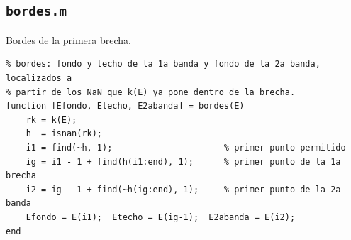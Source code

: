 \documentclass[hidelinks]{article}
\begin{document}
\subsection{\texttt{bordes.m}}
Bordes de la primera brecha.
\begin{lstlisting}
% bordes: fondo y techo de la 1a banda y fondo de la 2a banda, localizados a
% partir de los NaN que k(E) ya pone dentro de la brecha.
function [Efondo, Etecho, E2abanda] = bordes(E)
    rk = k(E);
    h  = isnan(rk);
    i1 = find(~h, 1);                      % primer punto permitido
    ig = i1 - 1 + find(h(i1:end), 1);      % primer punto de la 1a brecha
    i2 = ig - 1 + find(~h(ig:end), 1);     % primer punto de la 2a banda
    Efondo = E(i1);  Etecho = E(ig-1);  E2abanda = E(i2);
end
\end{lstlisting}
\end{document}
